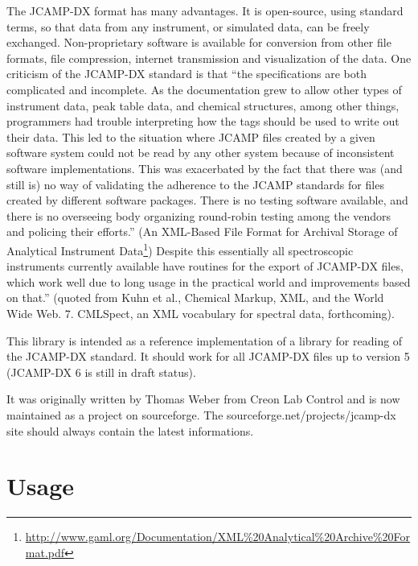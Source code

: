 \documentclass[a4paper]{book}
\begin{document}
The JCAMP-DX format has many advantages. It is open-source, using standard terms, so that data from any instrument, or simulated data, can be freely exchanged. Non-proprietary software is available for conversion from other file formats, file compression, internet transmission and visualization of the data. One criticism of the JCAMP-DX standard is that ``the specifications are both complicated and
incomplete. As the documentation grew to allow other types of instrument data, peak table data, and chemical structures, among other things, programmers had trouble interpreting how the tags should be used to write out their data. This led to the situation where JCAMP files created by a given software system could not be read by any other system because of inconsistent software implementations. This
was exacerbated by the fact that there was (and still is) no way of validating the adherence to the JCAMP standards for files created by different software packages. There is no testing software available, and there is no overseeing body organizing round-robin testing among the vendors and policing their efforts.'' (An XML-Based File Format for Archival Storage of Analytical Instrument Data\footnote{\url{http://www.gaml.org/Documentation/XML\%20Analytical\%20Archive\%20Format.pdf}{}}) Despite this essentially all spectroscopic instruments currently available have routines for the export of JCAMP-DX files, which work well due to long usage in the practical world and improvements based on that.'' (quoted from Kuhn et al., Chemical Markup, XML, and the World Wide Web. 7. CMLSpect, an XML vocabulary for spectral data, forthcoming).

This library is intended as a reference implementation of a library for reading of the JCAMP-DX standard. It should work for all JCAMP-DX files up to version 5 (JCAMP-DX 6 is still in draft status).

It was originally written by Thomas Weber from Creon Lab Control and is now maintained as a project on sourceforge. The sourceforge.net/projects/jcamp-dx site should always contain the latest informations.


\chapter{Usage}
\end{document}
